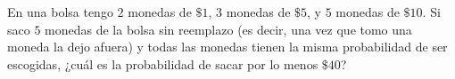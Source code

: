 En una bolsa tengo $2$ monedas de $\$1$, $3$ monedas de $\$5$, y $5$ monedas de $\$10$. Si saco $5$ monedas de la bolsa sin reemplazo (es decir, una vez que tomo una moneda la dejo afuera) y todas las monedas tienen la misma probabilidad de ser escogidas, ¿cuál es la probabilidad de sacar por lo menos $\$40$?